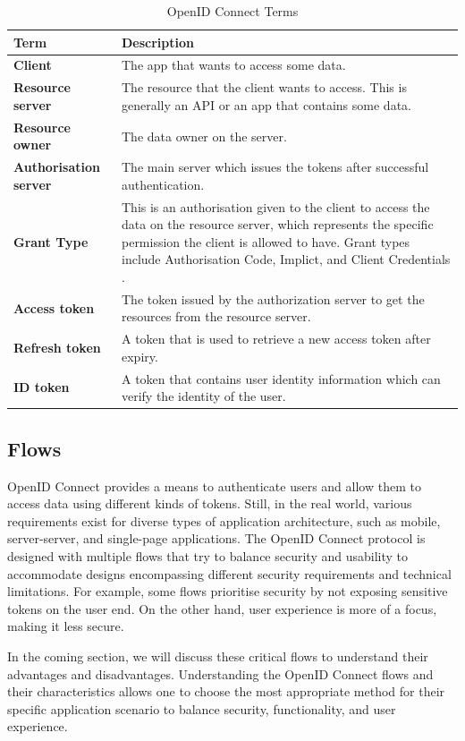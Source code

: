 \begingroup
\centering
\setlength{\tabcolsep}{6.5pt} %
\begin{longtable}{|p{4cm}|p{10cm}|}
\caption{OpenID Connect Terms}
    \label{table:oauth_terms}
\hline
\rowcolor{grey!15}
\textbf{Term} & \textbf{Description} \\ 
\hline

\textbf{Client} & The app that wants to access some data. \\ \hline
\textbf{Resource server} & The resource that the client wants to access. This is generally an API or an app that contains some data. \\ \hline
\textbf{Resource owner} & The data owner on the server. \\ \hline
\textbf{Authorisation server} & The main server which issues the tokens after successful authentication.\\ \hline
\textbf{Grant Type} & This is an authorisation given to the client to access the data on the resource server, which represents the specific permission the client is allowed to have. Grant types include Authorisation Code, Implict, and Client Credentials \citep{adv_api_sec}.  \\ \hline
\textbf{Access token} & The token issued by the authorization server to get the resources from the resource server. \\ \hline
\textbf{Refresh token} & A token that is used to retrieve a new access token after expiry. \\ \hline
\textbf{ID token} & A token that contains user identity information which can verify the identity of the user. \\ \hline
\end{longtable}
\endgroup

\subsection{Flows}
OpenID Connect provides a means to authenticate users and allow them to access data using different kinds of tokens. Still, in the real world, various requirements exist for diverse types of application architecture, such as mobile, server-server, and single-page applications. The OpenID Connect protocol is designed with multiple flows that try to balance security and usability to accommodate designs encompassing different security requirements and technical limitations. For example, some flows prioritise security by not exposing sensitive tokens on the user end. On the other hand, user experience is more of a focus, making it less secure. 
\par
In the coming section, we will discuss these critical flows to understand their advantages and disadvantages. Understanding the OpenID Connect flows and their characteristics allows one to choose the most appropriate method for their specific application scenario to balance security, functionality, and user experience.



